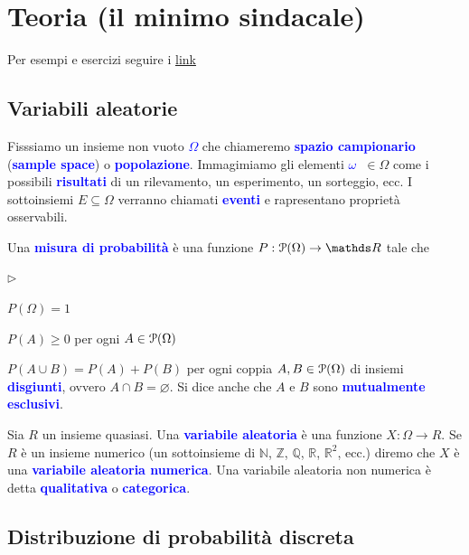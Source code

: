 \documentclass[12pt,openany]{book}
\def\RR{\mathds R}
\def\ZZ{\mathds Z}
\def\NN{\mathds N}
\def\QQ{\mathds Q}
\def\P{\EuScript P}
\def\0{\varnothing}
\newcommand{\mylabel}[1]{{\footnotesize\textsf{#1}}\hfill}
\renewenvironment{itemize}
  {\begin{list}{$\triangleright$}{%
   \setlength{\parskip}{0mm}
   \setlength{\topsep}{.2\baselineskip}
   \setlength{\rightmargin}{0mm}
   \setlength{\listparindent}{0mm}
   \setlength{\itemindent}{0mm}
   \setlength{\labelwidth}{3ex}
   \setlength{\itemsep}{.4\baselineskip}
   \setlength{\parsep}{0mm}
   \setlength{\partopsep}{0mm}
   \setlength{\labelsep}{1ex}
   \setlength{\leftmargin}{\labelwidth+\labelsep}
   \let\makelabel\mylabel}}{%
   \end{list}\vspace*{-1.3mm}}
\def\emph#1{\textcolor{blue}{\textbf{\boldmath #1}}}
\theoremstyle{mio}
\theoremstyle{liscio}
\begin{document}
\setlength{\abovedisplayskip}{-1ex}
\setlength{\belowdisplayskip}{0pt}




\chapter{Teoria (il minimo sindacale)}
\raggedbottom

Per esempi e esercizi seguire i \hyperref[ch2]{link \faShare}


\clearpage\section{Variabili aleatorie}


\def\medrel#1{\parbox[t]{6ex}{$\displaystyle\hfil #1$}}
\def\ceq#1#2#3{\parbox{25ex}{$\displaystyle #1$}\medrel{#2}$\displaystyle  #3$}


Fisssiamo un insieme non vuoto \emph{$\Omega$\/} che chiameremo \emph{spazio campionario\/}  (\emph{sample space\/}) o \emph{popolazione}. Immagimiamo gli elementi \emph{$\omega$\ }$\in\Omega$ come i possibili \emph{risultati\/} di un rilevamento, un esperimento, un sorteggio, ecc. I sottoinsiemi $E\subseteq\Omega$ verranno chiamati \emph{eventi\/} e rapresentano proprietà osservabili.

Una \emph{misura di probabilità\/} è una funzione $P:\P(\Omega)\to\RR$ tale che 

\begin{itemize}
\item $P(\Omega)=1$
\item $P(A)\ge0$ per ogni $A\in\P(\Omega)$
\item $P(A\cup B)=P(A)+P(B)$ per ogni coppia $A,B\in\P(\Omega)$ di insiemi \emph{disgiunti}, ovvero $A\cap B=\0$. Si dice anche che $A$ e $B$ sono \emph{mutualmente esclusivi}.
\end{itemize}

Sia $R$ un insieme quasiasi. Una \emph{variabile aleatoria\/} è una funzione $X:\Omega\to R$. Se $R$ è un insieme numerico (un sottoinsieme di $\NN$, $\ZZ$, $\QQ$, $\RR$, $\RR^2$, ecc.) diremo che $X$ è una \emph{variabile aleatoria numerica}. Una variabile aleatoria non numerica è detta \emph{qualitativa\/} o \emph{categorica}.


\clearpage\section{Distribuzione di probabilità discreta}
\end{document}

